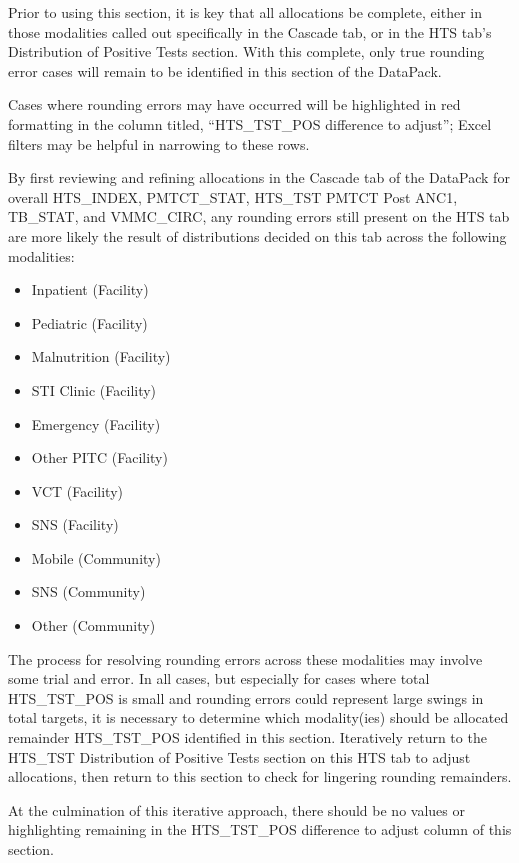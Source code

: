 \documentclass[
  openany]{book}
\begin{document}
Prior to using this section, it is key that all allocations be complete, either in those modalities called out specifically in the Cascade tab, or in the HTS tab's Distribution of Positive Tests section. With this complete, only true rounding error cases will remain to be identified in this section of the DataPack.

Cases where rounding errors may have occurred will be highlighted in red formatting in the column titled, ``HTS\_TST\_POS difference to adjust''; Excel filters may be helpful in narrowing to these rows.

By first reviewing and refining allocations in the Cascade tab of the DataPack for overall HTS\_INDEX, PMTCT\_STAT, HTS\_TST PMTCT Post ANC1, TB\_STAT, and VMMC\_CIRC, any rounding errors still present on the HTS tab are more likely the result of distributions decided on this tab across the following modalities:

\begin{itemize}
\item
  Inpatient (Facility)
\item
  Pediatric (Facility)
\item
  Malnutrition (Facility)
\item
  STI Clinic (Facility)
\item
  Emergency (Facility)
\item
  Other PITC (Facility)
\item
  VCT (Facility)
\item
  SNS (Facility)
\item
  Mobile (Community)
\item
  SNS (Community)
\item
  Other (Community)
\end{itemize}

The process for resolving rounding errors across these modalities may involve some trial and error. In all cases, but especially for cases where total HTS\_TST\_POS is small and rounding errors could represent large swings in total targets, it is necessary to determine which modality(ies) should be allocated remainder HTS\_TST\_POS identified in this section. Iteratively return to the HTS\_TST Distribution of Positive Tests section on this HTS tab to adjust allocations, then return to this section to check for lingering rounding remainders.

At the culmination of this iterative approach, there should be no values or highlighting remaining in the HTS\_TST\_POS difference to adjust column of this section.
\end{document}

